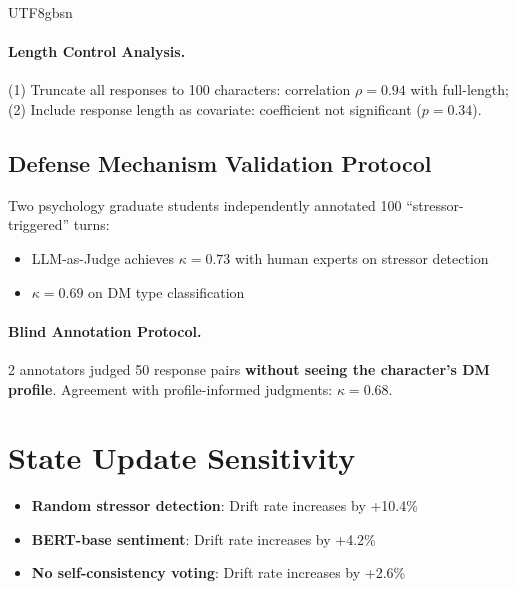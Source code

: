 \documentclass[11pt]{article}
\begin{document}
\begin{CJK*}{UTF8}{gbsn}
\paragraph{Length Control Analysis.} (1) Truncate all responses to 100 characters: correlation $\rho=0.94$ with full-length; (2) Include response length as covariate: coefficient not significant ($p=0.34$).

\subsection{Defense Mechanism Validation Protocol}
\label{sec:dm_validation}

Two psychology graduate students independently annotated 100 ``stressor-triggered'' turns:
\begin{itemize}
    \item LLM-as-Judge achieves $\kappa=0.73$ with human experts on stressor detection
    \item $\kappa=0.69$ on DM type classification
\end{itemize}

\paragraph{Blind Annotation Protocol.} 2 annotators judged 50 response pairs \textbf{without seeing the character's DM profile}. Agreement with profile-informed judgments: $\kappa = 0.68$.

\section{State Update Sensitivity}
\label{sec:sensitivity}

\begin{itemize}
    \item \textbf{Random stressor detection}: Drift rate increases by +10.4\%
    \item \textbf{BERT-base sentiment}: Drift rate increases by +4.2\%
    \item \textbf{No self-consistency voting}: Drift rate increases by +2.6\%
\end{itemize}


\end{CJK*}
\end{document}
